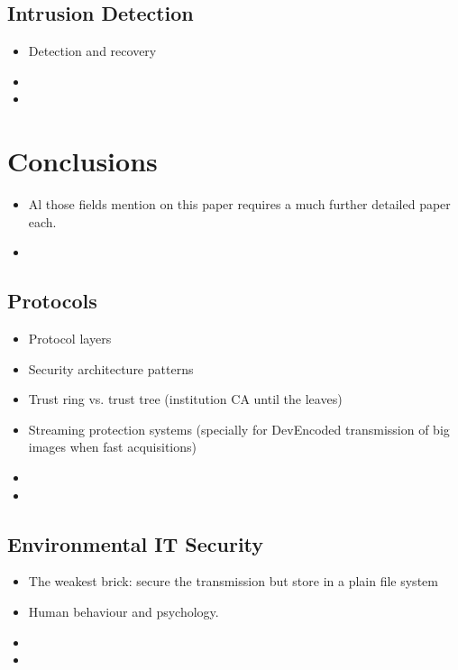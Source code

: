 \documentclass[10pt,a4paper,twoside]{llncs}
\begin{document}
%
\subsection{Intrusion Detection \label{sec:intrusionDetection}}

\begin{itemize}
 \item Detection and recovery
 \item 
 \item 
\end{itemize}

%
\section{Conclusions \label{sec:conclusions}}

\begin{itemize}
 \item Al those fields mention on this paper requires a much further detailed paper each.
 \item 
\end{itemize}

%
\subsection{Protocols \label{sec:protocols}}

\begin{itemize}
 \item Protocol layers \cite{Schneier:1995:ACP:572932}
 \item Security architecture patterns
 \item Trust ring vs. trust tree (institution CA until the leaves)
 \item Streaming protection systems (specially for DevEncoded transmission of big images when fast acquisitions)
 \item 
 \item 
\end{itemize}

%
\subsection{Environmental IT Security \label{sec:environment}}

\begin{itemize}
 \item The weakest brick: secure the transmission but store in a plain file system
 \item Human behaviour and psychology.
 \item 
 \item 
\end{itemize}
\end{document}
